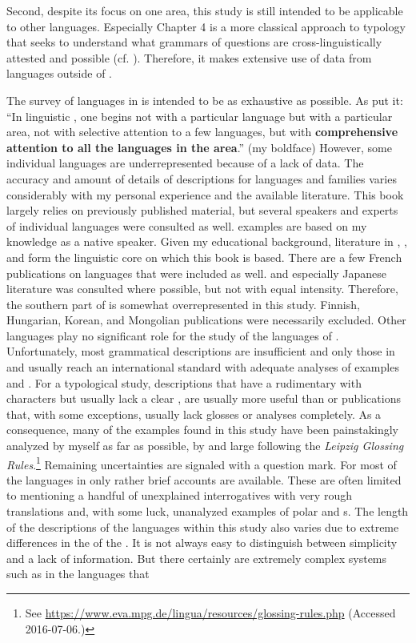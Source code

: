 \noindent Second, despite its focus on one area, this study is still intended to be applicable to other languages. Especially Chapter 4 is a more classical approach to typology that seeks to understand what grammars of questions are cross-linguistically attested and possible (cf. \citealt{Hölzl2016a}). Therefore, it makes extensive use of data from languages outside of .

The survey of languages in  is intended to be as exhaustive as possible. As \citet[2]{VoegelinVoegelin1964} put it: “In linguistic , one begins not with a particular language but with a particular area, not with selective attention to a few languages, but with \textbf{comprehensive attention to all the languages in the area}.” (my boldface) However, some individual languages are underrepresented because of a lack of data. The accuracy and amount of details of descriptions for languages and families varies considerably with my personal experience and the available literature. This book largely relies on previously published material, but several speakers and experts of individual languages were consulted as well.  examples are based on my knowledge as a native speaker. Given my educational background, literature in , , and  form the linguistic core on which this book is based. There are a few French publications on  languages that were included as well.  and especially Japanese literature was consulted where possible, but not with equal intensity. Therefore, the southern part of  is somewhat overrepresented in this study. Finnish, Hungarian, Korean, and Mongolian publications were necessarily excluded. Other languages play no significant role for the study of the languages of . Unfortunately, most grammatical descriptions are insufficient and only those in  and  usually reach an international standard with adequate analyses of examples and . For a typological study,  descriptions that have a rudimentary  with characters but usually lack a clear , are usually more useful than  or  publications that, with some exceptions, usually lack glosses or analyses completely. As a consequence, many of the examples found in this study have been painstakingly analyzed by myself as far as possible, by and large following the \textit{Leipzig Glossing Rules}.\footnote{See \url{https://www.eva.mpg.de/lingua/resources/glossing-rules.php} (Accessed 2016-07-06.)} Remaining uncertainties are signaled with a question mark. For most of the languages in  only rather brief accounts are available. These are often limited to mentioning a handful of unexplained interrogatives with very rough translations and, with some luck, unanalyzed examples of polar and s. The length of the descriptions of the languages within this study also varies due to extreme differences in the  of the . It is not always easy to distinguish between simplicity and a lack of information. But there certainly are extremely complex systems such as in the  languages that 